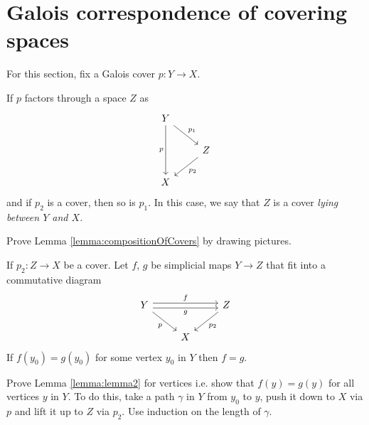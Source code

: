 \section{Galois correspondence of covering spaces}
For this section, fix a Galois cover $p: Y \longrightarrow X$.

\begin{lemma}
\label{lemma:compositionOfCovers}
  If $p$ factors through a space $Z$ as
  \begin{equation*}
    \begin{tikzcd}
      Y \ar[rd, "p_1"] \ar[dd, "p"']\\
        & Z \ar[ld,"p_2"] \\
      X
    \end{tikzcd}
  \end{equation*}
  and if $p_2$ is a cover, then so is $p_1$.
  In this case, we say that $Z$ is a cover \emph{lying between $Y$ and $X$.}
\end{lemma}
\begin{qbox}
  Prove Lemma \ref{lemma:compositionOfCovers} by drawing pictures.
\end{qbox}

\begin{lemma}
\label{lemma:lemma2}
  If $p_2:Z \rightarrow X$ be a cover. Let $f$, $g$ be simplicial maps $Y \rightarrow Z$ that fit into a commutative diagram
  \begin{equation*}
    \begin{tikzcd}
      Y \ar[rr, shift left, "f"] \ar[rr, shift right, "g"']  \ar[rd, "p"']
      & & Z \ar[ld,"p_2"] \\
      & X
    \end{tikzcd}
  \end{equation*}
  If $f(y_0) = g(y_0)$ for some vertex $y_0$ in $Y$ then $f = g$.
\end{lemma}
\begin{qbox}
  Prove Lemma \ref{lemma:lemma2} for vertices i.e. show that $f(y) = g(y)$ for all vertices $y$ in $Y$. To do this, take a path $\gamma$ in $Y$ from $y_0$ to $y$, push it down to $X$ via $p$ and lift it up to $Z$ via $p_2$. Use induction on the length of $\gamma$.
\end{qbox}


